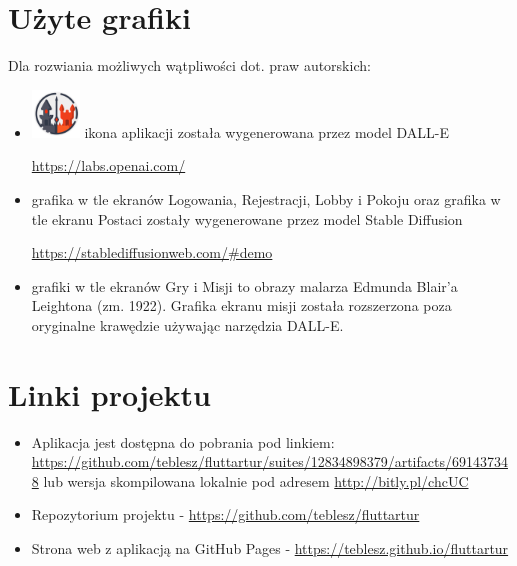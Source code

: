 \documentclass[12pt]{article}
\begin{document}
\newpage
\section{Użyte grafiki}
Dla rozwiania możliwych wątpliwości dot. praw autorskich:
\begin{itemize}
    \item \includegraphics[width=0.1\textwidth]{./img/icon.png} ikona aplikacji została wygenerowana przez model DALL-E 
    
    \url{https://labs.openai.com/}

    \item grafika w tle ekranów Logowania, Rejestracji, Lobby i Pokoju oraz grafika w tle ekranu Postaci zostały wygenerowane przez model Stable Diffusion 
    
    \url{https://stablediffusionweb.com/#demo}
    \item grafiki w tle ekranów Gry i Misji to obrazy malarza Edmunda Blair'a Leightona (zm. 1922). Grafika ekranu misji została rozszerzona poza oryginalne krawędzie używając narzędzia DALL-E.
\end{itemize}



\section{Linki projektu}
\begin{itemize}
    \item 
    Aplikacja jest dostępna do pobrania pod linkiem: \\
    \url{https://github.com/teblesz/fluttartur/suites/12834898379/artifacts/691437348} lub wersja skompilowana lokalnie pod adresem \url{http://bitly.pl/chcUC}
    \item Repozytorium projektu - \url{https://github.com/teblesz/fluttartur}
    \item Strona web z aplikacją na GitHub Pages - \url{https://teblesz.github.io/fluttartur}
\end{itemize}
\end{document}
